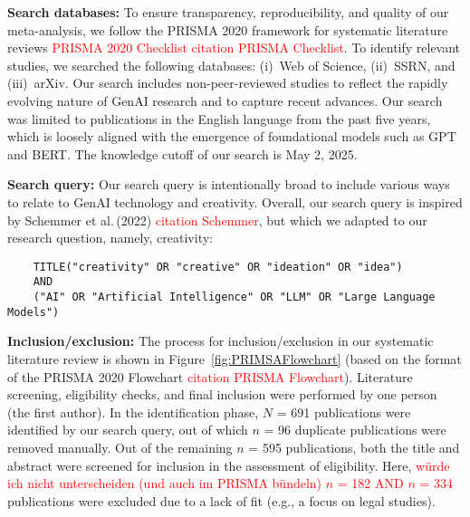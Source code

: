 \documentclass[manuscript, screen, review, acmsmall, anonymous]{acmart}
\newcommand{\TODO}[1]{\textcolor{red}{#1}}
\begin{document}
\textbf{Search databases:} To ensure transparency, reproducibility, and quality of our meta-analysis, we follow the PRISMA 2020 framework for systematic literature reviews \TODO{PRISMA 2020 Checklist} \TODO{citation PRISMA Checklist}. To identify relevant studies, we searched the following databases: (i)~Web of Science, (ii)~SSRN, and (iii)~arXiv. Our search includes non-peer-reviewed studies to reflect the rapidly evolving nature of GenAI research and to capture recent advances. Our search was limited to publications in the English language from the past five years, which is loosely aligned with the emergence of foundational models such as GPT and BERT. The knowledge cutoff of our search is May 2, 2025.

\textbf{Search query:} Our search query is intentionally broad to include various ways to relate to GenAI technology and creativity. Overall, our search query is inspired by Schemmer et al.\,(2022) \cite{Schemmer2022} \TODO{citation Schemmer}, but which we adapted to our research question, namely, creativity:

  \begin{tcolorbox}[
    enhanced,
    breakable,
    center upper, 
    colback=gray!10,
    colframe=gray!60!black,
    boxrule=0.8pt,
    arc=4pt,
    outer arc=4pt,
    drop shadow={black!50!white,opacity=0.3},
    width=\textwidth,
    fontupper=\footnotesize,
    title=\textbf{Search query}
  ]
    \begin{verbatim}
    TITLE("creativity" OR "creative" OR "ideation" OR "idea")
    AND
    ("AI" OR "Artificial Intelligence" OR "LLM" OR "Large Language Models")
    \end{verbatim}
  \end{tcolorbox}

\textbf{Inclusion/exclusion:} The process for inclusion/exclusion in our systematic literature review is shown in Figure~\ref{fig:PRIMSAFlowchart} (based on the format of the PRISMA 2020 Flowchart \TODO{citation PRISMA Flowchart}). Literature screening, eligibility checks, and final inclusion were performed by one person (the first author). In the identification phase, $N$ = 691 publications were identified by our search query, out of which $n$ = 96 duplicate publications were removed manually. Out of the remaining $n$ = 595 publications, both the title and abstract were screened for inclusion in the assessment of eligibility. Here, \TODO{würde ich nicht unterscheiden (und auch im PRISMA bündeln) $n$ = 182 AND $n$ = 334} publications were excluded due to a lack of fit (e.g., a focus on legal studies). 
\end{document}
